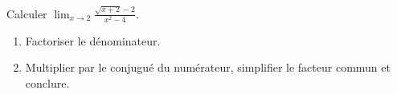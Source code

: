 \documentclass[11pt,a4paper]{article}
\begin{document}
\begin{exercice}
Calculer $\displaystyle\lim_{x\to 2}\frac{\sqrt{x+2}-2}{x^2-4}$.
\begin{enumerate}[label=\alph*),leftmargin=2em,itemsep=3pt]
  \item Factoriser le dénominateur.
  \item Multiplier par le conjugué du numérateur, simplifier le facteur commun et conclure.
\end{enumerate}
\end{exercice}
\end{document}
